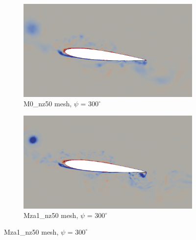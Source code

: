 \begin{figure}[H]
	\centering
	\begin{center}
		\begin{subfigure}[b]{0.6\textwidth}
			\centering
			\includegraphics[width=1\textwidth]{figures/zonal_adapt_results/vorticity_plots_Re200k/M0/phase_300.png}
			\caption{M0\_nz50 mesh, $\psi$ = $300^\circ$}
			\label{fig:M0_Re200k_sp_psi300}
		\end{subfigure}
	\end{center}
	\begin{subfigure}[b]{0.6\textwidth}
		\centering
		\includegraphics[width=1\textwidth]{figures/zonal_adapt_results/vorticity_plots_Re200k/Mza1_50/phase_300.png}
		\caption{Mza1\_nz50 mesh, $\psi$ = $300^\circ$}
		\label{fig:Mza1_50_Re200k_sp_psi300}
	\end{subfigure}

\end{figure}
